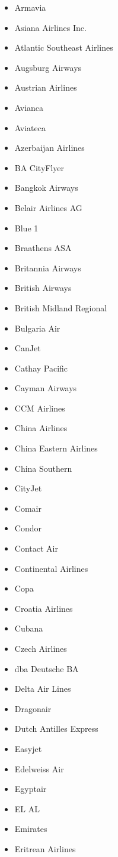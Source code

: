 \begin{itemize}
\begin{itemize}
	\item Armavia
	\item Asiana Airlines Inc.
	\item Atlantic Southeast Airlines
	\item Augsburg Airways
	\item Austrian Airlines
	\item Avianca
	\item Aviateca
	\item Azerbaijan Airlines
	\item BA CityFlyer
	\item Bangkok Airways
	\item Belair Airlines AG
	\item Blue 1
	\item Braathens ASA
	\item Britannia  Airways
	\item British Airways
	\item British Midland Regional
	\item Bulgaria Air
	\item CanJet
	\item Cathay Pacific
	\item Cayman Airways
	\item CCM Airlines
	\item China Airlines
	\item China Eastern Airlines
	\item China Southern
	\item CityJet
	\item Comair
	\item Condor
	\item Contact Air
	\item Continental Airlines
	\item Copa
	\item Croatia Airlines
	\item Cubana
	\item Czech Airlines
	\item dba Deutsche BA
	\item Delta Air Lines
	\item Dragonair
	\item Dutch Antilles Express
	\item Easyjet
	\item Edelweiss Air
	\item Egyptair
	\item EL AL
	\item Emirates
	\item Eritrean Airlines

\end{itemize}
\end{itemize}
